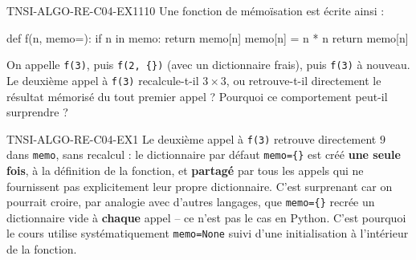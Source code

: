
\begin{exercice}{TNSI-ALGO-RE-C04-EX1}{1}{10}
Une fonction de mémoïsation est écrite ainsi :
\begin{python}
def f(n, memo={}):
    if n in memo:
        return memo[n]
    memo[n] = n * n
    return memo[n]
\end{python}
On appelle \lstinline{f(3)}, puis \lstinline|f(2, {})| (avec un dictionnaire frais), puis \lstinline{f(3)} à nouveau. Le deuxième appel à \lstinline{f(3)} recalcule-t-il $3 \times 3$, ou retrouve-t-il directement le résultat mémorisé du tout premier appel ? Pourquoi ce comportement peut-il surprendre ?
\end{exercice}


\begin{corrige}{TNSI-ALGO-RE-C04-EX1}
Le deuxième appel à \lstinline{f(3)} retrouve directement $9$ dans \lstinline{memo}, sans recalcul : le dictionnaire par défaut \lstinline|memo={}| est créé \textbf{une seule fois}, à la définition de la fonction, et \textbf{partagé} par tous les appels qui ne fournissent pas explicitement leur propre dictionnaire. C'est surprenant car on pourrait croire, par analogie avec d'autres langages, que \lstinline|memo={}| recrée un dictionnaire vide à \textbf{chaque} appel -- ce n'est pas le cas en Python. C'est pourquoi le cours utilise systématiquement \lstinline{memo=None} suivi d'une initialisation à l'intérieur de la fonction.
\end{corrige}
